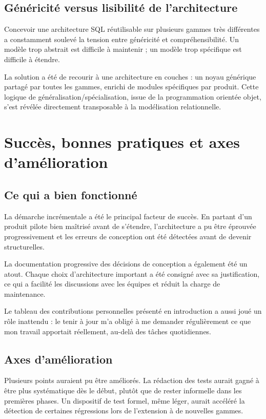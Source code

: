 \subsection{Généricité versus lisibilité de l'architecture}

Concevoir une architecture SQL réutilisable sur plusieurs gammes très différentes a constamment soulevé la tension entre généricité et compréhensibilité. Un modèle trop abstrait est difficile à maintenir ; un modèle trop spécifique est difficile à étendre.

La solution a été de recourir à une architecture en couches : un noyau générique partagé par toutes les gammes, enrichi de modules spécifiques par produit. Cette logique de généralisation/spécialisation, issue de la programmation orientée objet, s'est révélée directement transposable à la modélisation relationnelle.

\section{Succès, bonnes pratiques et axes d'amélioration}

\subsection{Ce qui a bien fonctionné}

La démarche incrémentale a été le principal facteur de succès. En partant d'un produit pilote bien maîtrisé avant de s'étendre, l'architecture a pu être éprouvée progressivement et les erreurs de conception ont été détectées avant de devenir structurelles.

La documentation progressive des décisions de conception a également été un atout. Chaque choix d'architecture important a été consigné avec sa justification, ce qui a facilité les discussions avec les équipes et réduit la charge de maintenance.

Le tableau des contributions personnelles présenté en introduction a aussi joué un rôle inattendu : le tenir à jour m'a obligé à me demander régulièrement ce que mon travail apportait réellement, au-delà des tâches quotidiennes.

\subsection{Axes d'amélioration}

Plusieurs points auraient pu être améliorés. La rédaction des tests aurait gagné à être plus systématique dès le début, plutôt que de rester informelle dans les premières phases. Un dispositif de test formel, même léger, aurait accéléré la détection de certaines régressions lors de l'extension à de nouvelles gammes.


